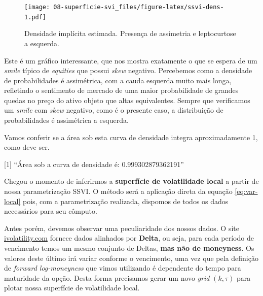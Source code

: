 \documentclass[]{book}
\newenvironment{Shaded}{\begin{snugshade}}{\end{snugshade}}
\newcommand{\KeywordTok}[1]{\textcolor[rgb]{0.13,0.29,0.53}{\textbf{#1}}}
\newcommand{\DataTypeTok}[1]{\textcolor[rgb]{0.13,0.29,0.53}{#1}}
\newcommand{\DecValTok}[1]{\textcolor[rgb]{0.00,0.00,0.81}{#1}}
\newcommand{\StringTok}[1]{\textcolor[rgb]{0.31,0.60,0.02}{#1}}
\newcommand{\ControlFlowTok}[1]{\textcolor[rgb]{0.13,0.29,0.53}{\textbf{#1}}}
\newcommand{\OperatorTok}[1]{\textcolor[rgb]{0.81,0.36,0.00}{\textbf{#1}}}
\newcommand{\NormalTok}[1]{#1}
\theoremstyle{definition}
\theoremstyle{definition}
\theoremstyle{definition}
\theoremstyle{remark}
\begin{document}
\begin{figure}
\centering
\texttt{[image: 08-superficie-svi\_files/figure-latex/ssvi-dens-1.pdf]}
\caption{\label{fig:ssvi-dens}Densidade implícita estimada. Presença de
assimetria e leptocurtose a esquerda.}
\end{figure}

Este é um gráfico interessante, que nos mostra exatamente o que se
espera de um \emph{smile} típico de \emph{equities} que possui
\emph{skew} negativo. Percebemos como a densidade de probabilidades é
assimétrica, com a cauda esquerda muito mais longa, refletindo o
sentimento de mercado de uma maior probabilidade de grandes quedas no
preço do ativo objeto que altas equivalentes. Sempre que verificamos um
\emph{smile} com \emph{skew} negativo, como é o presente caso, a
distribuição de probabilidades é assimétrica a esquerda.

Vamos conferir se a área sob esta curva de densidade integra
aproximadamente 1, como deve ser.

\begin{Shaded}
\end{Shaded}

{[}1{]} ``Área sob a curva de densidade é: 0.999302879362191''

Chegou o momento de inferirmos a \textbf{superfície de volatilidade
local} a partir de nossa parametrização SSVI. O método será a aplicação
direta da equação \eqref{eq:var-local} pois, com a parametrização
realizada, dispomos de todos os dados necessários para seu cômputo.

Antes porém, devemos observar uma peculiaridade dos nossos dados. O site
\href{https://ivolatility.com}{ivolatility.com} fornece dados alinhados
por \textbf{Delta}, ou seja, para cada período de vencimento temos um
mesmo conjunto de Deltas, \textbf{mas não de moneyness}. Os valores
deste último irá variar conforme o vencimento, uma vez que pela
definição de \emph{forward log-moneyness} que vimos utilizando é
dependente do tempo para maturidade da opção. Desta forma precisamos
gerar um novo \emph{grid} \((k, \tau)\) para plotar nossa superfície de
volatilidade local.
\end{document}
